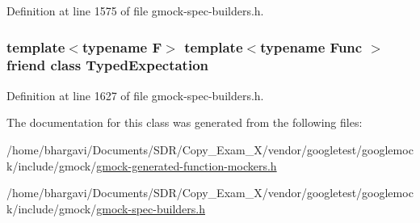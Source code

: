 Definition at line 1575 of file gmock-\/spec-\/builders.\+h.

\subsubsection[{\texorpdfstring{Typed\+Expectation}{TypedExpectation}}]{\setlength{\rightskip}{0pt plus 5cm}template$<$typename F$>$ template$<$typename Func $>$ friend class {\bf Typed\+Expectation}\hspace{0.3cm}{\ttfamily [friend]}}\hypertarget{classtesting_1_1internal_1_1_function_mocker_base_a4f17de55396a8ef740d5ad2b1380a851}{}\label{classtesting_1_1internal_1_1_function_mocker_base_a4f17de55396a8ef740d5ad2b1380a851}


Definition at line 1627 of file gmock-\/spec-\/builders.\+h.



The documentation for this class was generated from the following files\+:\begin{DoxyCompactItemize}
\item 
/home/bhargavi/\+Documents/\+S\+D\+R/\+Copy\+\_\+\+Exam\+\_\+X/vendor/googletest/googlemock/include/gmock/\hyperlink{gmock-generated-function-mockers_8h}{gmock-\/generated-\/function-\/mockers.\+h}\item 
/home/bhargavi/\+Documents/\+S\+D\+R/\+Copy\+\_\+\+Exam\+\_\+X/vendor/googletest/googlemock/include/gmock/\hyperlink{gmock-spec-builders_8h}{gmock-\/spec-\/builders.\+h}\end{DoxyCompactItemize}
